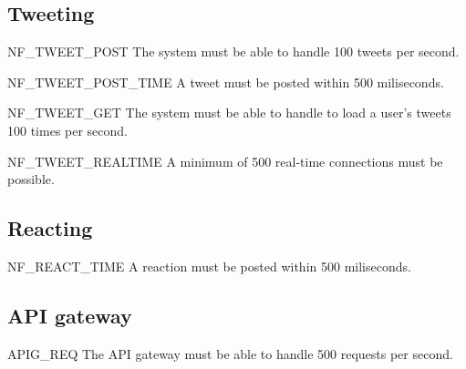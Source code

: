 \subsection{Tweeting}
\begin{tereqdef}{NF_TWEET_POST}
    The system must be able to handle 100 tweets per second.
\end{tereqdef}

\begin{tereqdef}{NF_TWEET_POST_TIME}
    A tweet must be posted within 500 miliseconds.    
\end{tereqdef}

\begin{tereqdef}{NF_TWEET_GET}
    The system must be able to handle to load a user's tweets 100 times per second.
\end{tereqdef}

\begin{tereqdef}{NF_TWEET_REALTIME}
    A minimum of 500 real-time connections must be possible.
\end{tereqdef}

\subsection{Reacting}

\begin{tereqdef}{NF_REACT_TIME}
    A reaction must be posted within 500 miliseconds.
\end{tereqdef}

\subsection{API gateway}

\begin{tereqdef}{APIG_REQ}
    The API gateway must be able to handle 500 requests per second.
\end{tereqdef}